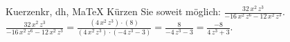 \begin{MAufgabe}{Kuerzen}{kr, dh, MaTeX}
K\"urzen Sie soweit m\"oglich: $\frac{32\, x^2\, z^3}{ - 16\, x^2\, z^6 - 12\, x^2\, z^3}$.\\ 
\ifLsg\MLoesung
\quad $\frac{32\, x^2\, z^3}{ - 16\, x^2\, z^6 - 12\, x^2\, z^3}=\frac{(4\, x^2\, z^3)\cdot(8)}{(4\, x^2\, z^3)\cdot( - 4\, z^3 - 3)}=\frac{8}{ - 4\, z^3 - 3}=\frac{-8}{4\, z^3 + 3}$.\else\relax\fi
 \end{MAufgabe}